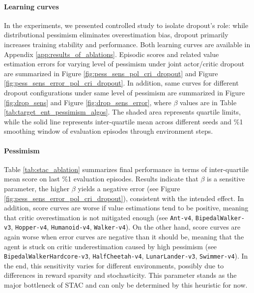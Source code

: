 \documentclass[10pt]{article} %
\begin{document}

\paragraph{Learning curves} 

In the experiments, we presented controlled study to isolate dropout's role: while distributional pessimism eliminates overestimation bias, dropout primarily increases training stability and performance. Both learning curves are available in Appendix \ref{app:results_of_ablations}. Episodic scores and related value estimation errors for varying level of pessimism under joint actor/critic dropout are summarized in Figure \ref{fig:pess_sens_pol_cri_dropout} and Figure \ref{fig:pess_sens_error_pol_cri_dropout}.  In addition, same curves for different dropout configurations under same level of pessimism are summarized in Figure \ref{fig:drop_sens} and Figure \ref{fig:drop_sens_error}, where $\beta$ values are in Table \ref{tab:target_ent_pessimism_algos}. The shaded area represents quartile limits, while the solid line represents inter-quartile mean across different seeds and \%1 smoothing window of evaluation episodes through environment steps. 

\paragraph{Pessimism} Table \ref{tab:stac_ablation} summarizes final performance in terms of inter-quartile mean score on last \%1 evaluation episodes. Results indicate that $\beta$ is a sensitive parameter, the higher $\beta$ yields a negative error (see Figure \ref{fig:pess_sens_error_pol_cri_dropout}), consistent with the intended effect. In addition, score curves are worse if value estimations tend to be positive, meaning that critic overestimation is not mitigated enough (see \verb|Ant-v4|, \verb|BipedalWalker-v3|, \verb|Hopper-v4|, \verb|Humanoid-v4|, \verb|Walker-v4|). On the other hand, score curves are again worse when error curves are negative than it should be, meaning that the agent is stuck on critic underestimation caused by high pessimism (see \verb|BipedalWalkerHardcore-v3|, \verb|HalfCheetah-v4|, \verb|LunarLander-v3|, \verb|Swimmer-v4|). In the end, this sensitivity varies for different environments, possibly due to differences in reward sparsity and stochasticity. This parameter stands as the major bottleneck of STAC and can only be determined by this heuristic for now. %
\end{document}
